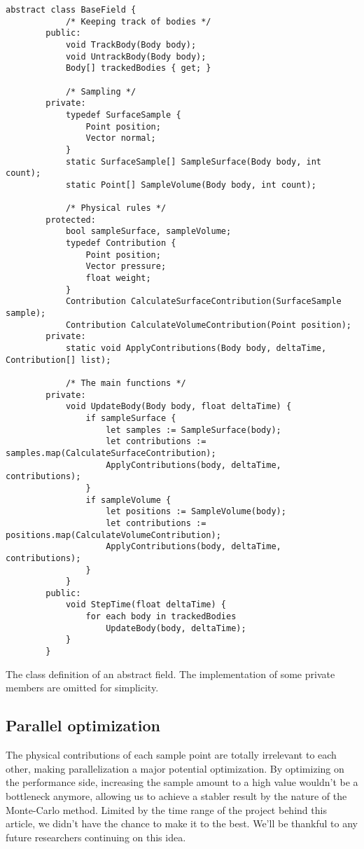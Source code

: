 \begin{table}[H]
	\begin{lstlisting}[style=sharpc]
		abstract class BaseField {
			/* Keeping track of bodies */
		public:
			void TrackBody(Body body);
			void UntrackBody(Body body);
			Body[] trackedBodies { get; }

			/* Sampling */
		private:
			typedef SurfaceSample {
				Point position;
				Vector normal;
			}
			static SurfaceSample[] SampleSurface(Body body, int count);
			static Point[] SampleVolume(Body body, int count);

			/* Physical rules */
		protected:
			bool sampleSurface, sampleVolume;
			typedef Contribution {
				Point position;
				Vector pressure;
				float weight;
			}
			Contribution CalculateSurfaceContribution(SurfaceSample sample);
			Contribution CalculateVolumeContribution(Point position);
		private:
			static void ApplyContributions(Body body, deltaTime, Contribution[] list);

			/* The main functions */
		private:
			void UpdateBody(Body body, float deltaTime) {
				if sampleSurface {
					let samples := SampleSurface(body);
					let contributions := samples.map(CalculateSurfaceContribution);
					ApplyContributions(body, deltaTime, contributions);
				}
				if sampleVolume {
					let positions := SampleVolume(body);
					let contributions := positions.map(CalculateVolumeContribution);
					ApplyContributions(body, deltaTime, contributions);
				}
			}
		public:
			void StepTime(float deltaTime) {
				for each body in trackedBodies
					UpdateBody(body, deltaTime);
			}
		}
	\end{lstlisting}
	\caption{
		The class definition of an abstract field.
		The implementation of some private members are omitted for simplicity.
	}
	\label{table:basefield-definition}
\end{table}

\subsection{Parallel optimization}

The physical contributions of each sample point are totally irrelevant to each other, making parallelization a major potential optimization.
By optimizing on the performance side, increasing the sample amount to a high value wouldn't be a bottleneck anymore, allowing us to achieve a stabler result by the nature of the Monte-Carlo method.
Limited by the time range of the project behind this article, we didn't have the chance to make it to the best.
We'll be thankful to any future researchers continuing on this idea.